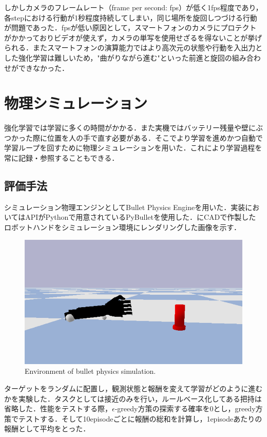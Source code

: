 しかしカメラのフレームレート（frame per second: fps）が低く1fps程度であり，各stepにおける行動が1秒程度持続してしまい，同じ場所を旋回しつづける行動が問題であった．fpsが低い原因として，スマートフォンのカメラにプロテクトがかかっておりビデオが使えず，カメラの単写を使用せざるを得ないことが挙げられる．またスマートフォンの演算能力ではより高次元の状態や行動を入出力とした強化学習は難しいため，"曲がりながら進む"といった前進と旋回の組み合わせができなかった．


\section{物理シミュレーション}
強化学習では学習に多くの時間がかかる．また実機ではバッテリー残量や壁にぶつかった際に位置を人の手で直す必要がある．そこでより学習を進めかつ自動で学習ループを回すために物理シミュレーションを用いた．これにより学習過程を常に記録・参照することもできる．


\subsection{評価手法}
シミュレーション物理エンジンとしてBullet Physics Engineを用いた．実装においてはAPIがPythonで用意されているPyBullet\cite{pybullet}を使用した．にCADで作製したロボットハンドをシミュレーション環境にレンダリングした画像を示す．

\begin{figure}[H]
    \centering
    \includegraphics[width=0.7\linewidth]{figure/chapter3/bullet_demo}
    \caption{Environment of bullet physics simulation.}
    \label{fig:1号機simu}
\end{figure}

ターゲットをランダムに配置し，観測状態と報酬を変えて学習がどのように進むかを実験した．タスクとしては接近のみを行い，ルールベース化してある把持は省略した．性能をテストする際，$\epsilon$-greedy方策の探索する確率を0とし，greedy方策でテストする．そして10episodeごとに報酬の総和を計算し，1episodeあたりの報酬として平均をとった．


